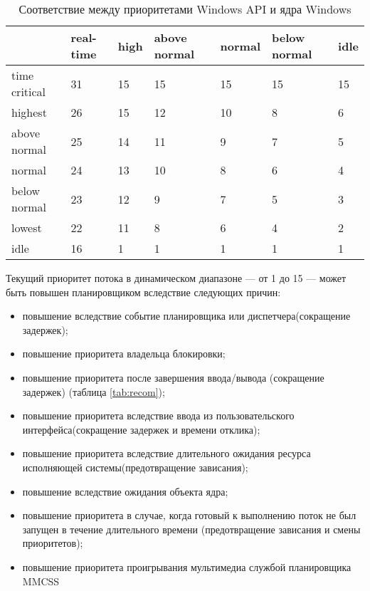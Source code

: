         \begin{table}[h]
            \caption{Соответствие между приоритетами Windows API и ядра Windows}
            \begin{center}
                \begin{tabular}{|l|p{45pt}|p{45pt}|p{45pt}|p{45pt}|p{45pt}|p{45pt}|}
                    \hline
                    {} & real-time & high & above normal & normal & below normal & idle\\
                    \hline
                    time critical & 31 & 15 & 15 & 15 & 15 & 15 \\
                    \hline
                    highest & 26 & 15 & 12 & 10 & 8 & 6 \\
                    \hline
                    above normal & 25 & 14 & 11 & 9 & 7 & 5 \\
                    \hline
                    normal & 24 & 13 & 10 & 8 & 6 & 4 \\
                    \hline
                    below normal & 23 & 12 & 9 & 7 & 5 & 3 \\
                    \hline
                    lowest & 22 & 11 & 8 & 6 & 4 & 2 \\
                    \hline
                    idle & 16 & 1 & 1 & 1 & 1 & 1 \\
                    \hline
                \end{tabular}
            \end{center}
            \label{tbl:priority}
        \end{table}
        
        
        Текущий приоритет потока в динамическом диапазоне — от 1 до 15 — может быть повышен планировщиком вследствие следующих причин:
        
        \begin{itemize}
            \item  повышение вследствие событие планировщика или диспетчера(сокращение задержек);
            \item повышение приоритета владельца блокировки;
            \item повышение приоритета после завершения ввода/вывода (сокращение задержек) (таблица \ref{tab:recom});
            \item повышение приоритета вследствие ввода из пользовательского интерфейса(сокращение задержек и времени отклика);
            \item повышение приоритета вследствие длительного ожидания ресурса исполняющей системы(предотвращение зависания);
            \item повышение вследствие ожидания объекта ядра;
            \item повышение приоритета в случае, когда готовый к выполнению поток не был запущен в течение длительного времени (предотвращение зависания и смены приоритетов);
            \item повышение приоритета проигрывания мультимедиа службой планировщика MMCSS
        \end{itemize}
        
